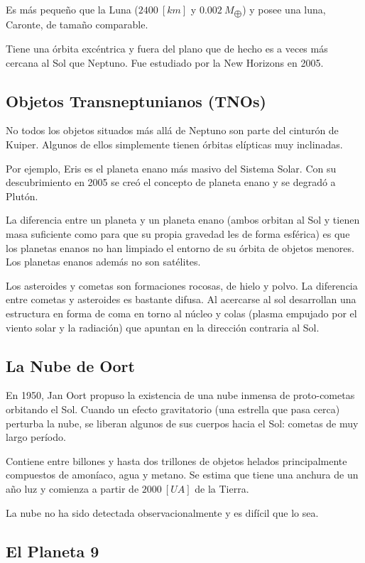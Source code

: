 \documentclass{tufte-handout}
\begin{document}
Es más pequeño que la Luna ($2400~[km]$ y $0.002~M_{\bigoplus}$) y posee una luna, Caronte, de tamaño comparable.

Tiene una órbita excéntrica y fuera del plano que de hecho es a veces más cercana al Sol que Neptuno. Fue estudiado por la New Horizons en 2005.

\subsection{Objetos Transneptunianos (TNOs)}

No todos los objetos situados más allá de Neptuno son parte del cinturón de Kuiper. Algunos de ellos simplemente tienen órbitas elípticas muy inclinadas.

Por ejemplo, Eris es el planeta enano más masivo del Sistema Solar. Con su descubrimiento en 2005 se creó el concepto de planeta enano y se degradó a Plutón.

La diferencia entre un planeta y un planeta enano (ambos orbitan al Sol y tienen masa suficiente como para que su propia gravedad les de forma esférica) es que los planetas enanos no han limpiado el entorno de su órbita de objetos menores. Los planetas enanos además no son satélites.

Los asteroides y cometas son formaciones rocosas, de hielo y polvo. La diferencia entre cometas y asteroides es bastante difusa. Al acercarse al sol desarrollan una estructura en forma de coma en torno al núcleo y colas (plasma empujado por el viento solar y la radiación) que apuntan en la dirección contraria al Sol.

\subsection{La Nube de Oort}

En 1950, Jan Oort propuso la existencia de una nube inmensa de proto-cometas orbitando el Sol. Cuando un efecto gravitatorio (una estrella que pasa cerca) perturba la nube, se liberan algunos de sus cuerpos hacia el Sol: cometas de muy largo período.

Contiene entre billones y hasta dos trillones de objetos helados principalmente compuestos de amoníaco, agua y metano. Se estima que tiene una anchura de un año luz y comienza a partir de $2000~[UA]$ de la Tierra.

La nube no ha sido detectada observacionalmente y es difícil que lo sea.

\subsection{El Planeta 9}
\end{document}
